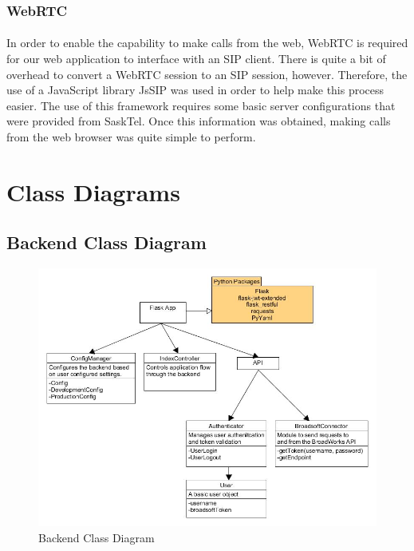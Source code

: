 \documentclass[12pt]{article}
\begin{document}
	\pagebreak
\subsubsection{WebRTC}
\paragraph{}
	In order to enable the capability to make calls from the web, WebRTC is required for our web application to interface with an SIP client. There is quite a bit of overhead to convert a WebRTC session to an SIP session, however. Therefore, the use of a JavaScript library JsSIP was used in order to help make this process easier. The use of this framework requires some basic server configurations that were provided from SaskTel. Once this information was obtained, making calls from the web browser was quite simple to perform.

\pagebreak
	
\section{Class Diagrams}
\subsection{Backend Class Diagram}


	\begin{figure}[htb]
	\includegraphics[width=\textwidth]{BackendClassDiagram.jpg}
	\caption{Backend Class Diagram}
	\end{figure}
	
\end{document}

